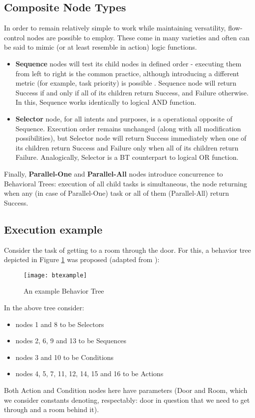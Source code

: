 \subsection{Composite Node Types}
In order to remain relatively simple to work while maintaining versatility, flow-control nodes are possible to employ. These come in many varieties and often can be said to mimic (or at least resemble in action) logic functions.
\begin{itemize}
    \item \textbf{Sequence} nodes will test its child nodes in defined order -  executing them from left to right is the common practice, although introducing a different metric (for example, task priority) is possible \cite{ksheperthesis}. Sequence node will return Success if and only if all of its children return Success, and Failure otherwise. In this, Sequence works identically to logical AND function.
    \item \textbf{Selector} node, for all intents and purposes, is a operational opposite of Sequence. Execution order remains unchanged (along with all modification possibilities), but Selector node will return Success immediately when one of its children return Success and Failure only when all of its children return Failure. Analogically, Selector is a BT counterpart to logical OR function.
\end{itemize}
Finally, \textbf{Parallel-One} and \textbf{Parallel-All} nodes introduce concurrence to Behavioral Trees: execution of all child tasks is simultaneous, the node returning when any (in case of Parallel-One) task or all of them (Parallel-All) return Success.

\subsection{Execution example}
Consider the task of getting to a room through the door. For this, a behavior tree depicted in Figure \ref{fig:x btexample} was proposed (adapted from \cite{ksheperthesis}):
\begin{figure}[h]
\centering
\texttt{[image: btexample]}
\caption{An example Behavior Tree}
\label{fig:x btexample}
\end{figure}
\newpage
In the above tree consider:
\begin{itemize}
    \item nodes 1 and 8 to be Selectors
    \item nodes 2, 6, 9 and 13 to be Sequences
    \item nodes 3 and 10 to be Conditions
    \item nodes 4, 5, 7, 11, 12, 14, 15 and 16 to be Actions
\end{itemize}
Both Action and Condition nodes here have parameters (Door and Room, which we consider constants denoting, respectably: door in question that we need to get through and a room behind it).

